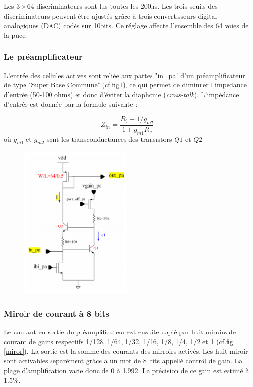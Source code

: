 Les $3\times 64$ discriminateurs sont lus toutes les 200ns. Les trois seuils des discriminateurs peuvent être ajustés grâce à trois convertisseurs digital-analogiques (DAC) codés sur 10bits. Ce réglage affecte l'ensemble des 64 voies de la puce.

\subsubsection{Le préamplificateur}
L'entrée des cellules actives sont reliée aux pattes "in\_pa" d'un préamplificateur de type "Super Base Commune" (cf.fig\ref{preampli}), ce qui permet de diminuer l'impédance d'entrée (50-100 ohms) et donc d'éviter la diaphonie (\textit{cross-talk}). L'impédance d'entrée est donnée par la formule suivante :

\begin{equation}
Z_{in}=\frac{R_0+1/g_{m2}}{1+g_{m1}R_c}
\end{equation}
où $g_{m1}$ et $g_{m2}$ sont les transconductances des transistors $Q1$ et $Q2$ 

\begin{figure}[th!]
	\centering
	\includegraphics[width=0.5\textwidth]{GLA/preampli.png}
	\label{preampli}
\end{figure}

\subsubsection{Miroir de courant à 8 bits}
Le courant en sortie du préamplificateur est ensuite copié par huit miroirs de courant de gains respectifs 1/128, 1/64, 1/32, 1/16, 1/8, 1/4, 1/2 et 1 (cf.fig \ref{miror}). La sortie est la somme des courants des mirroirs activés. Les huit miroir sont activables séparément grâce à un mot de 8 bits appellé contrôl de gain. La plage d'amplification varie donc de 0 à 1.992. La précision de ce gain est estimé à 1.5\%. 

